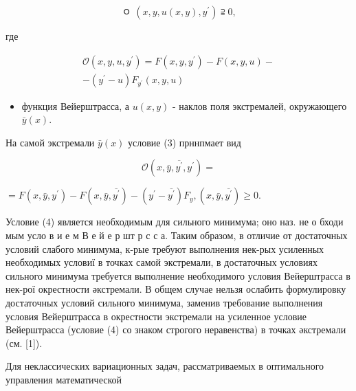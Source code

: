 \documentclass[10pt]{article}
\begin{document}
\[
\text { ㅇ }\left(x, y, u(x, y), y^{\prime}\right) \supseteqq 0 \text {, }
\]

где

\[
\begin{gathered}
\mathscr{O}\left(x, y, u, y^{\prime}\right)=F\left(x, y, y^{\prime}\right)-F(x, y, u)- \\
-\left(y^{\prime}-u\right) F_{y^{\prime}}(x, y, u)
\end{gathered}
\]

\begin{itemize}
  \item функция Вейерштрасса, а $u(x, y)$ - наклов поля экстремалей, окружающего $\bar{y}(x)$.
\end{itemize}

На самой экстремали $\bar{y}(x)$ условие (3) прннпмает вид

\[
\mathscr{O}\left(x, \bar{y}, \overline{y^{\prime}}, y^{\prime}\right)=
\]

$=F\left(x, \bar{y}, y^{\prime}\right)-F\left(x, \bar{y}, \overline{y^{\prime}}\right)-\left(y^{\prime}-\overline{y^{\prime}}\right) F_{y},\left(x, \bar{y}, \overline{y^{\prime}}\right) \geqslant 0$.

Условие (4) является необходимым для сильного минимума; оно наз. не о бходи мым усло в и е м В е й е р шт р с с а. Таким образом, в отличие от достаточных условий слабого минимума, к-рые требуют выполнения нек-рых усиленных необходимых условиї в точках самой экстремали, в достаточных условиях сильного минимума требуется выполнение необходимого условия Вейерштрасса в нек-рої окрестности әкстремали. В общем случае нельзя ослабить формулировку достаточных условий сильного минимума, заменив требование выполнения условия Вейерштрасса в окрестности экстремали на усиленное условие Вейерштрасса (условие (4) со знаком строгого неравенства) в точках әкстремали (см. [1]).

Для неклассических вариационных задач, рассматриваемых в оптимального управления математической
\end{document}
